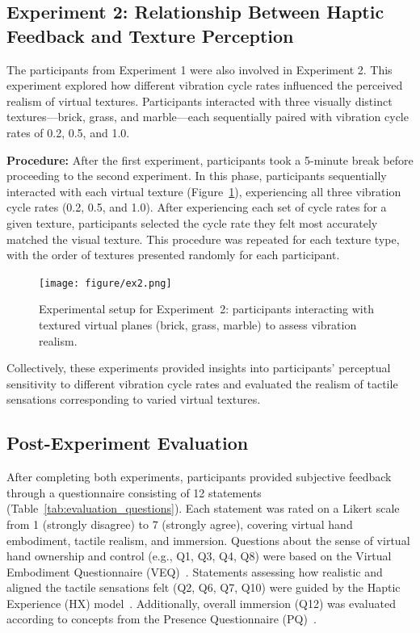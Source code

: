 \documentclass[graybox]{svmult}
\begin{document}
\subsection{Experiment 2: Relationship Between Haptic Feedback and Texture Perception}
The participants from Experiment 1 were also involved in Experiment 2. This experiment explored how different vibration cycle rates influenced the perceived realism of virtual textures. Participants interacted with three visually distinct textures—brick, grass, and marble—each sequentially paired with vibration cycle rates of 0.2, 0.5, and 1.0.

\textbf{Procedure:} After the first experiment, participants took a 5-minute break before proceeding to the second experiment. In this phase, participants sequentially interacted with each virtual texture (Figure~\ref{fig:experiment2_setup}), experiencing all three vibration cycle rates (0.2, 0.5, and 1.0). After experiencing each set of cycle rates for a given texture, participants selected the cycle rate they felt most accurately matched the visual texture. This procedure was repeated for each texture type, with the order of textures presented randomly for each participant.

\begin{figure}\centering
	\texttt{[image: figure/ex2.png]}%
	\caption{Experimental setup for Experiment~2: participants interacting with textured virtual planes (brick, grass, marble) to assess vibration realism.}\label{fig:experiment2_setup}
\end{figure}

Collectively, these experiments provided insights into participants' perceptual sensitivity to different vibration cycle rates and evaluated the realism of tactile sensations corresponding to varied virtual textures.

\subsection{Post-Experiment Evaluation}
After completing both experiments, participants provided subjective feedback through a questionnaire consisting of 12 statements (Table~\ref{tab:evaluation_questions}). Each statement was rated on a Likert scale from 1 (strongly disagree) to 7 (strongly agree), covering virtual hand embodiment, tactile realism, and immersion. Questions about the sense of virtual hand ownership and control (e.g., Q1, Q3, Q4, Q8) were based on the Virtual Embodiment Questionnaire (VEQ)~\cite{roth2017alpha}. Statements assessing how realistic and aligned the tactile sensations felt (Q2, Q6, Q7, Q10) were guided by the Haptic Experience (HX) model~\cite{schneider2017haptic}. Additionally, overall immersion (Q12) was evaluated according to concepts from the Presence Questionnaire (PQ)~\cite{witmer1998measuring}.
\end{document}
